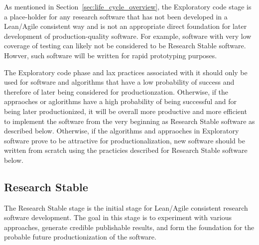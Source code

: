 \documentclass[11pt]{SANDreport}
\begin{document}
As mentioned in Section~\ref{sec:life_cycle_overview}, the Exploratory
code stage is a place-holder for any research software that has not
been developed in a Lean/Agile consistent way and is not an
appropriate direct foundation for later development of
production-quality software.  For example, software with very low
coverage of testing can likely not be considered to be Research Stable
software.  Howver, such software will be written for rapid prototyping
purposes.

The Exploratory code phase and lax practices associated with it should
only be used for software and algorithms that have a low probability
of success and therefore of later being considered for
productionzation.  Otherwise, if the appraoches or aglorithms have a
high probability of being successful and for being later
productionized, it will be overall more productive and more efficient
to implement the software from the very beginning as Research Stable
software as described below.  Otherwise, if the algorithms and
appraoches in Exploratory software prove to be attractive for
productionalization, new software should be written from scratch using
the practicies described for Research Stable software below.


%
{}\subsection{Research Stable}
\label{sec:research_stable_code}
%

The Research Stable stage is the initial stage for Lean/Agile
consistent research software development.  The goal in this stage is
to experiment with various approaches, generate credible publishable
results, and form the foundation for the probable future
productionization of the software.
\end{document}
